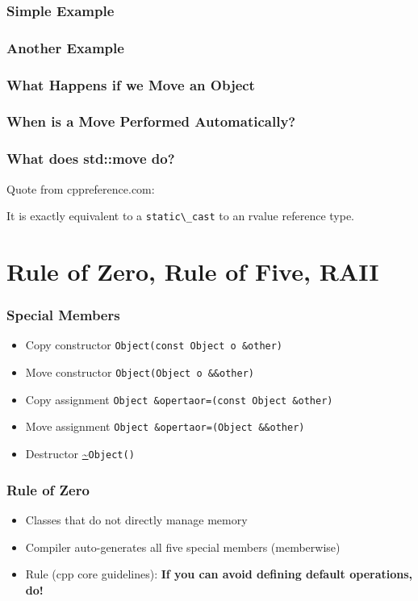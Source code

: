 \documentclass[usenames,dvipsnames,svgnames,table,aspectratio=169]{beamer}
\begin{document}
\begin{frame}
    \frametitle{Simple Example}
    
\end{frame}

\begin{frame}
    \frametitle{Another Example}
    
\end{frame}

\begin{frame}
    \frametitle{What Happens if we Move an Object}
    
\end{frame}

\begin{frame}
    \frametitle{When is a Move Performed Automatically?}
    
\end{frame}

\begin{frame}
    \frametitle{What does std::move do?}
    Quote from cppreference.com:
    
    It is exactly equivalent to a \lstinline|static\_cast| to an rvalue reference type. 
    \pause
    
\end{frame}

\section{Rule of Zero, Rule of Five, RAII}

\begin{frame}
    \frametitle{Special Members}
    \begin{itemize}
        \item<+-> Copy constructor \lstinline{Object(const Object o &other)}
        \item<+-> Move constructor \lstinline{Object(Object o &&other)}
        \item<+-> Copy assignment \lstinline{Object &opertaor=(const Object &other)}
        \item<+-> Move assignment \lstinline{Object &opertaor=(Object &&other)}
        \item<+-> Destructor \url{~}\lstinline{Object()}
    \end{itemize}
\end{frame}

\begin{frame}
    \frametitle{Rule of Zero}
    \begin{itemize}
        \item<+-> Classes that do not directly manage memory
        \item<+-> Compiler auto-generates all five special members (memberwise)
        \item<+-> Rule (cpp core guidelines): \textbf{If you can avoid defining default operations, do!}
    \end{itemize}
    \only<+->{}
\end{frame}
\end{document}
